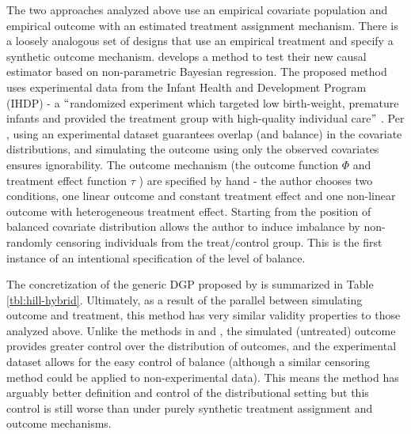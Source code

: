 \documentclass[../main.tex]{subfiles}
\begin{document}
\vspace{\baselineskip}
The two approaches analyzed above use an empirical covariate population and empirical outcome with an estimated treatment assignment mechanism. There is a loosely analogous set of designs that use an empirical treatment and specify a synthetic outcome mechanism. \textcite{Hill2011BayesianInference} develops a method to test their new causal estimator based on non-parametric Bayesian regression. The proposed method uses experimental data from the Infant Health and Development Program (IHDP) - a $``$randomized experiment which targeted low birth-weight, premature infants and provided the treatment group with high-quality individual care$"$ \parencite{Brooks-Gunn1991TheProgram}. Per \textcite{Hill2011BayesianInference}, using an experimental dataset guarantees overlap (and balance) in the covariate distributions, and simulating the outcome using only the observed covariates ensures ignorability. The outcome mechanism (the outcome function  \(  \Phi  \) and treatment effect function  \(  \tau \) ) are specified by hand - the author chooses two conditions, one linear outcome and constant treatment effect and one non-linear outcome with heterogeneous treatment effect. Starting from the position of balanced covariate distribution allows the author to induce imbalance by non-randomly censoring individuals from the treat/control group. This is the first instance of an intentional specification of the level of balance.\par


\vspace{\baselineskip}
The concretization of the generic DGP proposed by \textcite{Hill2011BayesianInference} is summarized in Table \ref{tbl:hill-hybrid}. Ultimately, as a result of the parallel between simulating outcome and treatment, this method has very similar validity properties to those analyzed above. Unlike the methods in \textcite{Huber2013TheScore} and \textcite{Knaus2018MachineEvidence}, the simulated (untreated) outcome provides greater control over the distribution of outcomes, and the experimental dataset allows for the easy control of balance (although a similar censoring method could be applied to non-experimental data). This means the method has arguably better definition and control of the distributional setting but this control is still worse than under purely synthetic treatment assignment and outcome mechanisms.\par
\end{document}
